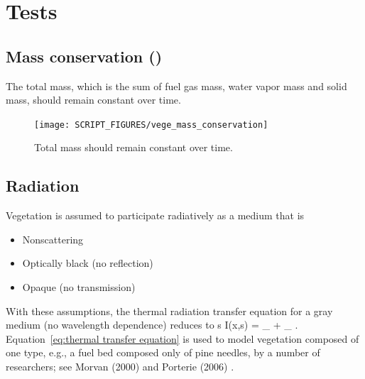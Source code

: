 \documentclass[11pt]{book}
\begin{document}
\section{Tests}
\subsection{Mass conservation (\texorpdfstring{}{vege\_mass\_conservation})}
\label{vege_mass_conservation}
The total mass, which is the sum of fuel gas mass, water vapor mass
and solid mass, should remain constant over time.
\begin{figure}[ht]
\centering
\texttt{[image: SCRIPT\_FIGURES/vege\_mass\_conservation]}
\caption[ test
case.]{Total mass should remain constant over time.}
\label{fig_vege_mass_conservation}
\end{figure}

\subsection{Radiation}
\label{radiation_gas-veg_consistency}
Vegetation is assumed to participate radiatively as a medium that is
\begin{itemize}
 \item Nonscattering
 \item Optically black (no reflection)
 \item Opaque (no transmission)
\end{itemize}

With these assumptions, the thermal radiation transfer equation for a
gray medium (no wavelength dependence) reduces to
\be
 s \cdot \nabla I(x,s) = \kappa_{}  + \kappa_{}
 .
\label{eq:thermal transfer equation}
\ee
Equation~\ref{eq:thermal transfer equation} is used to model
vegetation composed of one type, e.g., a fuel bed composed only of
pine needles, by a number of researchers; see Morvan (2000)
\cite{Morvan:2000} and Porterie (2006) \cite{Porterie:2006}.
\end{document}
